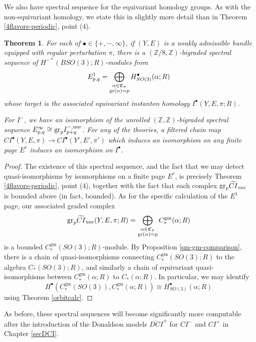 \documentclass{memo-l}
\newtheorem{theorem}{Theorem}[chapter]
\theoremstyle{definition}
\theoremstyle{remark}
\numberwithin{section}{chapter}
\numberwithin{equation}{chapter}
\begin{document}
We also have spectral sequence for the equivariant homology groups. As with the non-equivariant homology, we state this in slightly more detail than in Theorem \ref{4flavors-periodic}, point (4).

\begin{theorem}\label{EqIndexSS}For each of $\bullet \in  \{+, -, \infty\}$, if $(Y, E)$ is a weakly admissible bundle equipped with regular perturbation $\pi$, there is a $(\mathbb Z/8, \mathbb Z)$-bigraded spectral sequence of $H^{-*}(BSO(3);R)$-modules from $$E^1_{p,q} = \bigoplus_{\substack{\alpha \in \mathfrak C_\pi\\ \textup{gr}(\alpha) = p}} H^\bullet_{SO(3)}(\alpha; R)$$ whose target is the associated equivariant instanton homology $I^\bullet(Y, E, \pi; R)$.

For $I^-$, we have an isomorphism of the unrolled $(\mathbb Z, \mathbb Z)$-bigraded spectral sequence $E^\infty_{p,q} \cong \textup{gr}_p I^{-, \textup{unr}}_{p+q}$. For any of the theories, a filtered chain map $CI^\bullet(Y, E,\pi) \to CI^\bullet(Y', E',\pi')$ which induces an isomorphism on any finite page $E^r$ induces an isomorphism on $I^\bullet$.
\end{theorem}

\begin{proof}The existence of this spectral sequence, and the fact that we may detect quasi-isomorphisms by isomorphisms on a finite page $E^r$, is precisely Theorem \ref{4flavors-periodic}, point (4), together with the fact that each complex $\text{gr}_p \widetilde{CI}_{\textup{unr}}$ is bounded above (in fact, bounded). As for the specific calculation of the $E^1$ page, our associated graded complex $$\text{gr}_p \widetilde{CI}_\textup{unr}(Y, E, \pi; R) = \bigoplus_{\substack{\alpha \in \mathfrak C_\pi\\ \textup{gr}(\alpha) = p}} C_*^{\text{gm}}(\alpha; R)$$ is a bounded $C_*^{\text{gm}}(SO(3);R)$-module. By Proposition \ref{sm-gm-comparison}, there is a chain of quasi-isomorphisms connecting $C_*^{\text{gm}}(SO(3);R)$ to the algebra $C_*(SO(3);R)$, and similarly a chain of equivariant quasi-isomorphisms between $C_*^{\text{gm}}(\alpha; R)$ to $C_*(\alpha; R)$. In particular, we may identify $$H^\bullet\left(C_*^{\text{gm}}(SO(3)), C_*^{\text{gm}}(\alpha; R)\right) \cong H^\bullet_{SO(3)}(\alpha; R)$$ using Theorem \ref{orbitcalc}. 
\end{proof}

As before, these spectral sequences will become significantly more computable after the introduction of the Donaldson models $\overline{DCI}^\pm$ for $CI^-$ and $CI^+$ in Chapter \ref{secDCI}.
\end{document}
